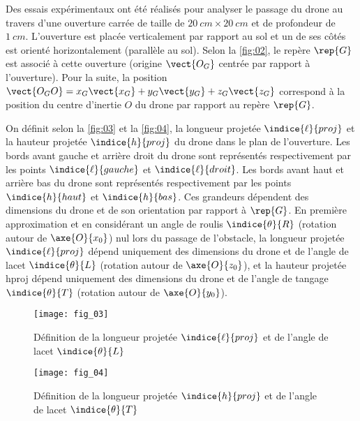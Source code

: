 Des essais expérimentaux ont été réalisés pour analyser le passage du drone au travers
d’une ouverture carrée de taille de $\SI{20}{cm} \times \SI{20}{cm}$ et de profondeur de $\SI{1}{cm}$. L’ouverture est placée verticalement par rapport au sol et un de ses côtés est orienté horizontalement
(parallèle au sol). Selon la \autoref{fig:02}, le repère $\rep{G}$ est associé à cette ouverture 
(origine $\vect{O_G}$ centrée par rapport à l’ouverture). Pour la suite, la position 
$\vect{O_G O} = x_G \vect{x_G}+y_G \vect{y_G}+z_G \vect{z_G}$
 correspond à la position du centre d’inertie $O$ du drone par rapport au repère $\rep{G}$.

On définit selon la \autoref{fig:03} et la \autoref{fig:04}, la longueur projetée $\indice{\ell}{proj}$ et la hauteur projetée $\indice{h}{proj}$ du
drone dans le plan de l’ouverture. Les bords avant gauche et arrière droit du drone sont
représentés respectivement par les points $\indice{\ell}{gauche}$ et $\indice{\ell}{droit}$. Les bords avant haut et arrière bas
du drone sont représentés respectivement par les points $\indice{h}{haut}$ et $\indice{h}{bas}$.
Ces grandeurs dépendent des dimensions du drone et de son orientation par rapport à $\rep{G}$. En
première approximation et en considérant un angle de roulis $\indice{\theta}{R}$ (rotation autour de $\axe{O}{x_0}$) nul
lors du passage de l’obstacle, la longueur projetée $\indice{\ell}{proj}$ dépend uniquement des dimensions
du drone et de l’angle de lacet $\indice{\theta}{L}$ (rotation autour de $\axe{O}{z_0}$), et la hauteur projetée hproj dépend
uniquement des dimensions du drone et de l’angle de tangage $\indice{\theta}{T}$ (rotation autour de $\axe{O}{y_0}$).


\noindent
\begin{minipage}[c]{.48\linewidth}
\begin{figure}[H]
\centering
\texttt{[image: fig\_03]}
\caption{\label{fig:03} ­Définition de la longueur projetée $\indice{\ell}{proj}$ et de l’angle de lacet $\indice{\theta}{L}$}
\end{figure}
\end{minipage}\hspace{.5cm}
\begin{minipage}[c]{.48\linewidth}
\begin{figure}[H]
\centering
\texttt{[image: fig\_04]}
\caption{\label{fig:04} ­Définition de la longueur projetée $\indice{h}{proj}$ et de l’angle de lacet $\indice{\theta}{T}$}
\end{figure}
\end{minipage}

